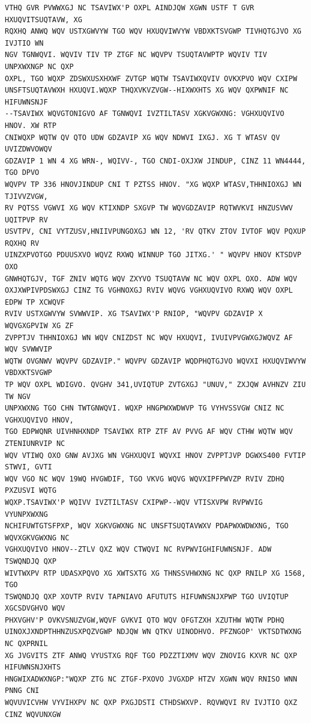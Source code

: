 \documentclass[12pt,a4paper]{article}
\begin{document}
\begin{lstlisting}[caption={Variant 9 intercepted ciphertext}, label={lst:intercept}]
VTHQ GVR PVWWXGJ NC TSAVIWX'P OXPL AINDJQW XGWN USTF T GVR HXUQVITSUQTAVW, XG
RQXHQ ANWQ WQV USTXGWVYW TGO WQV HXUQVIWVYW VBDXKTSVGWP TIVHQTGJVO XG IVJTIO WN
NGV TGNWQVI. WQVIV TIV TP ZTGF NC WQVPV TSUQTAVWPTP WQVIV TIV UNPXWXNGP NC QXP
OXPL, TGO WQXP ZDSWXUSXHXWF ZVTGP WQTW TSAVIWXQVIV OVKXPVO WQV CXIPW
UNSFTSUQTAVWXH HXUQVI.WQXP THQXVKVZVGW--HIXWXHTS XG WQV QXPWNIF NC HIFUWNSNJF
--TSAVIWX WQVGTONIGVO AF TGNWQVI IVZTILTASV XGKVGWXNG: VGHXUQVIVO HNOV. XW RTP
CNIWQXP WQTW QV QTO UDW GDZAVIP XG WQV NDWVI IXGJ. XG T WTASV QV UVIZDWVOWQV
GDZAVIP 1 WN 4 XG WRN-, WQIVV-, TGO CNDI-OXJXW JINDUP, CINZ 11 WN4444, TGO DPVO
WQVPV TP 336 HNOVJINDUP CNI T PZTSS HNOV. "XG WQXP WTASV,THHNIOXGJ WN TJIVVZVGW,
RV PQTSS VGWVI XG WQV KTIXNDP SXGVP TW WQVGDZAVIP RQTWVKVI HNZUSVWV UQITPVP RV
USVTPV, CNI VYTZUSV,HNIIVPUNGOXGJ WN 12, 'RV QTKV ZTOV IVTOF WQV PQXUP RQXHQ RV
UINZXPVOTGO PDUUSXVO WQVZ RXWQ WINNUP TGO JITXG.' " WQVPV HNOV KTSDVP OXO
GNWHQTGJV, TGF ZNIV WQTG WQV ZXYVO TSUQTAVW NC WQV OXPL OXO. ADW WQV
OXJXWPIVPDSWXGJ CINZ TG VGHNOXGJ RVIV WQVG VGHXUQVIVO RXWQ WQV OXPL EDPW TP XCWQVF
RVIV USTXGWVYW SVWWVIP. XG TSAVIWX'P RNIOP, "WQVPV GDZAVIP X WQVGXGPVIW XG ZF
ZVPPTJV THHNIOXGJ WN WQV CNIZDST NC WQV HXUQVI, IVUIVPVGWXGJWQVZ AF WQV SVWWVIP
WQTW OVGNWV WQVPV GDZAVIP." WQVPV GDZAVIP WQDPHQTGJVO WQVXI HXUQVIWVYW VBDXKTSVGWP
TP WQV OXPL WDIGVO. QVGHV 341,UVIQTUP ZVTGXGJ "UNUV," ZXJQW AVHNZV ZIU TW NGV
UNPXWXNG TGO CHN TWTGNWQVI. WQXP HNGPWXWDWVP TG VYHVSSVGW CNIZ NC VGHXUQVIVO HNOV,
TGO EDPWQNR UIVHNHXNDP TSAVIWX RTP ZTF AV PVVG AF WQV CTHW WQTW WQV ZTENIUNRVIP NC
WQV VTIWQ OXO GNW AVJXG WN VGHXUQVI WQVXI HNOV ZVPPTJVP DGWXS400 FVTIP STWVI, GVTI
WQV VGO NC WQV 19WQ HVGWDIF, TGO VKVG WQVG WQVXIPFPWVZP RVIV ZDHQ PXZUSVI WQTG
WQXP.TSAVIWX'P WQIVV IVZTILTASV CXIPWP--WQV VTISXVPW RVPWVIG VYUNPXWXNG
NCHIFUWTGTSFPXP, WQV XGKVGWXNG NC UNSFTSUQTAVWXV PDAPWXWDWXNG, TGO WQVXGKVGWXNG NC
VGHXUQVIVO HNOV--ZTLV QXZ WQV CTWQVI NC RVPWVIGHIFUWNSNJF. ADW TSWQNDJQ QXP
WIVTWXPV RTP UDASXPQVO XG XWTSXTG XG THNSSVHWXNG NC QXP RNILP XG 1568, TGO
TSWQNDJQ QXP XOVTP RVIV TAPNIAVO AFUTUTS HIFUWNSNJXPWP TGO UVIQTUP XGCSDVGHVO WQV
PHXVGHV'P OVKVSNUZVGW,WQVF GVKVI QTO WQV OFGTZXH XZUTHW WQTW PDHQ
UINOXJXNDPTHHNZUSXPQZVGWP NDJQW WN QTKV UINODHVO. PFZNGOP' VKTSDTWXNG NC QXPRNIL
XG JVGVITS ZTF ANWQ VYUSTXG RQF TGO PDZZTIXMV WQV ZNOVIG KXVR NC QXP HIFUWNSNJXHTS
HNGWIXADWXNGP:"WQXP ZTG NC ZTGF-PXOVO JVGXDP HTZV XGWN WQV RNISO WNN PNNG CNI
WQVUVICVHW VYVIHXPV NC QXP PXGJDSTI CTHDSWXVP. RQVWQVI RV IVJTIO QXZ CINZ WQVUNXGW

\end{lstlisting}
\end{document}
